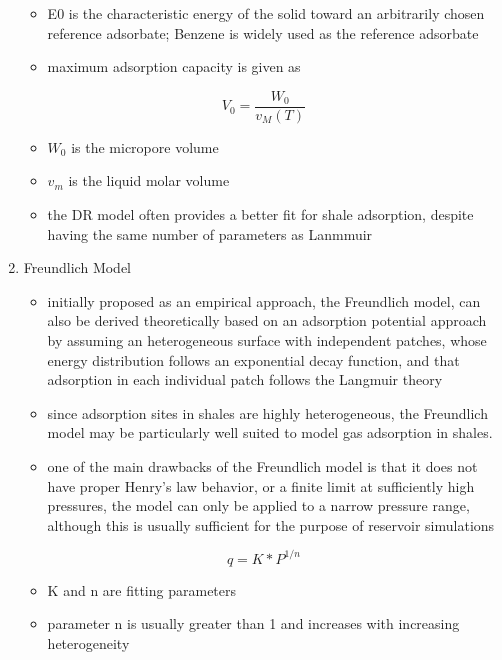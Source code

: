 \documentclass[11pt]{article}
\begin{document}
\begin{enumerate}
\begin{equation}
\end{equation}
\begin{itemize}
\item E0 is the characteristic energy of the solid toward an arbitrarily chosen reference adsorbate; Benzene is widely used as the reference adsorbate
\item maximum adsorption capacity is given as
\end{itemize}
\begin{equation}
V_0 = \frac{W_0}{v_M(T)}
\end{equation}
\begin{itemize}
\item \(W_0\) is the micropore volume
\item \(v_m\) is the liquid molar volume
\item the DR model often provides a better fit for shale adsorption, despite having the same number of parameters as Lanmmuir \cite{Clarkson1997}
\end{itemize}
\item Freundlich Model
\label{sec:org38da783}
\begin{itemize}
\item initially proposed as an empirical approach, the Freundlich model, can also be derived theoretically based on an adsorption potential approach by assuming an heterogeneous surface with independent patches, whose energy distribution follows an exponential decay function, and that adsorption in each individual patch follows the Langmuir theory \cite{Do1998}
\item since adsorption sites in shales are highly heterogeneous, the Freundlich model may be particularly well suited to model gas adsorption in shales.
\item one of the main drawbacks of the Freundlich model is that it does not have proper Henry's law behavior, or a finite limit at sufficiently high pressures, the model can only be applied to a narrow pressure range, although this is usually sufficient for the purpose of reservoir simulations
\end{itemize}
\begin{equation}
q = K * P ^{1/n}
\end{equation}
\begin{itemize}
\item K and n are fitting parameters
\item parameter n is usually greater than 1 and increases with increasing heterogeneity
\end{itemize}

\end{enumerate}
\end{document}
